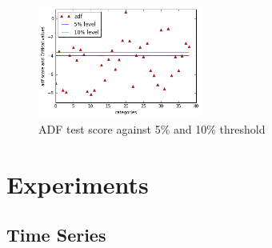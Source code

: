 \documentclass[11pt,conference]{IEEEtran}
\begin{document}
\begin{figure}[H]
\begin{center}
\includegraphics [width=0.48\textwidth]{pics/adf_test.png}
\caption{ADF test score against 5\% and 10\% threshold }
\end{center}
\end{figure}

\section{Experiments}
\subsection{Time Series}
\end{document}
